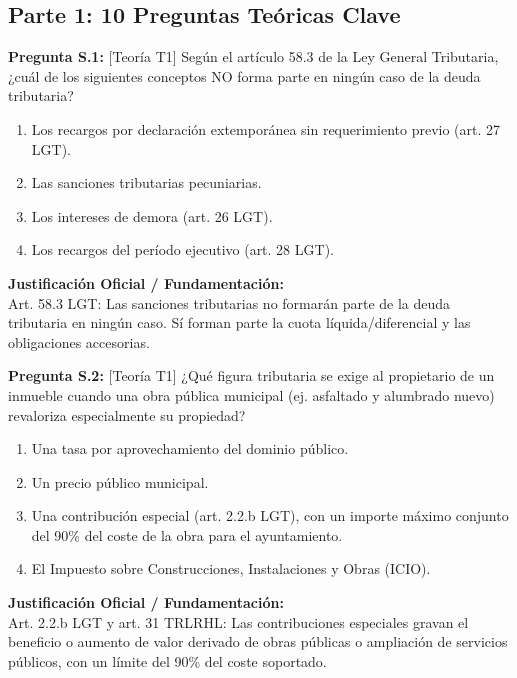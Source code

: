 \documentclass[11pt,a4paper,openany]{article}
\begin{document}
\vspace{0.3cm}
\subsection{Parte 1: 10 Preguntas Teóricas Clave}

\noindent\textbf{\sffamily Pregunta S.1:} [Teoría T1] Según el artículo 58.3 de la Ley General Tributaria, ¿cuál de los siguientes conceptos NO forma parte en ningún caso de la deuda tributaria?\\[0.15cm]
\begin{enumerate}[label=\textbf{\alph*)},leftmargin=1.8em,itemsep=1.5pt,topsep=2pt,partopsep=0pt,parsep=0pt]
    \item Los recargos por declaración extemporánea sin requerimiento previo (art. 27 LGT).
    \item Las sanciones tributarias pecuniarias.
    \item Los intereses de demora (art. 26 LGT).
    \item Los recargos del período ejecutivo (art. 28 LGT).
\end{enumerate}
\begin{solucionBox}
\textbf{Justificación Oficial / Fundamentación:}\\[0.1cm]
Art. 58.3 LGT: Las sanciones tributarias no formarán parte de la deuda tributaria en ningún caso. Sí forman parte la cuota líquida/diferencial y las obligaciones accesorias.
\end{solucionBox}
\vspace{0.35cm}

\noindent\textbf{\sffamily Pregunta S.2:} [Teoría T1] ¿Qué figura tributaria se exige al propietario de un inmueble cuando una obra pública municipal (ej. asfaltado y alumbrado nuevo) revaloriza especialmente su propiedad?\\[0.15cm]
\begin{enumerate}[label=\textbf{\alph*)},leftmargin=1.8em,itemsep=1.5pt,topsep=2pt,partopsep=0pt,parsep=0pt]
    \item Una tasa por aprovechamiento del dominio público.
    \item Un precio público municipal.
    \item Una contribución especial (art. 2.2.b LGT), con un importe máximo conjunto del 90\% del coste de la obra para el ayuntamiento.
    \item El Impuesto sobre Construcciones, Instalaciones y Obras (ICIO).
\end{enumerate}
\begin{solucionBox}
\textbf{Justificación Oficial / Fundamentación:}\\[0.1cm]
Art. 2.2.b LGT y art. 31 TRLRHL: Las contribuciones especiales gravan el beneficio o aumento de valor derivado de obras públicas o ampliación de servicios públicos, con un límite del 90\% del coste soportado.
\end{solucionBox}
\vspace{0.35cm}
\end{document}
